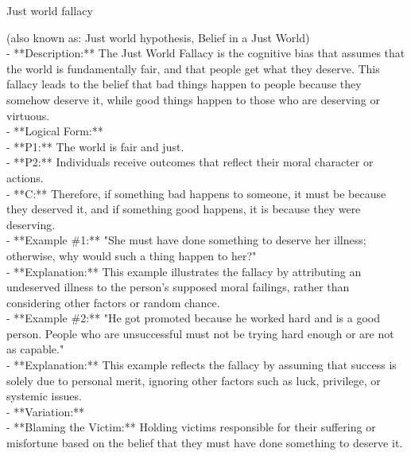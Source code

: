 \documentclass[a4paper,12pt,single,pdftex]{scrartcl}
\begin{document}
  

Just world fallacy
    
      (also known as: Just world hypothesis, Belief in a Just World)
    \\

  
    
      - **Description:** The Just World Fallacy is the cognitive bias that assumes that the world is fundamentally fair, and that people get what they deserve. This fallacy leads to the belief that bad things happen to people because they somehow deserve it, while good things happen to those who are deserving or virtuous.
    \\

    
      - **Logical Form:**
    \\

    
        - **P1:** The world is fair and just.
    \\

    
        - **P2:** Individuals receive outcomes that reflect their moral character or actions.
    \\

    
        - **C:** Therefore, if something bad happens to someone, it must be because they deserved it, and if something good happens, it is because they were deserving.
    \\

    
      - **Example \#1:** "She must have done something to deserve her illness; otherwise, why would such a thing happen to her?"
    \\

    
      - **Explanation:** This example illustrates the fallacy by attributing an undeserved illness to the person’s supposed moral failings, rather than considering other factors or random chance.
    \\

    
      - **Example \#2:** "He got promoted because he worked hard and is a good person. People who are unsuccessful must not be trying hard enough or are not as capable."
    \\

    
      - **Explanation:** This example reflects the fallacy by assuming that success is solely due to personal merit, ignoring other factors such as luck, privilege, or systemic issues.
    \\

    
      - **Variation:**
    \\

    
        - **Blaming the Victim:** Holding victims responsible for their suffering or misfortune based on the belief that they must have done something to deserve it.
    \\
\end{document}
